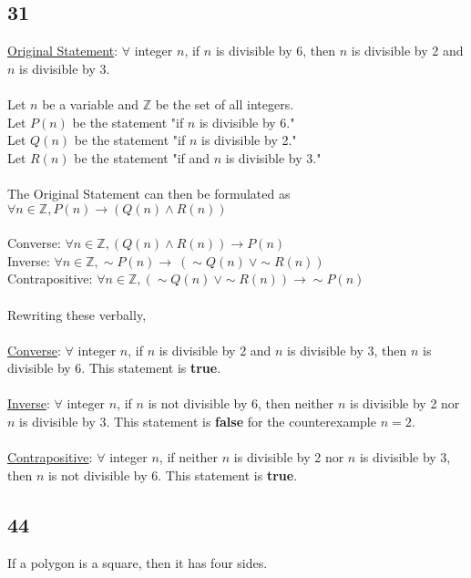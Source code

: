 \documentclass[12pt]{article}
\begin{document}
\subsection*{31}
\underline{Original Statement}: $\forall$ integer $n$, if $n$ is divisible by 6, then $n$ is divisible by 2 and $n$ is divisible by $3$.
\\ \\
Let $n$ be a variable and $\mathbb{Z}$ be the set of all integers. \\
Let $P(n)$ be the statement "if $n$ is divisible by 6." \\
Let $Q(n)$ be the statement "if $n$ is divisible by 2." \\
Let $R(n)$ be the statement "if and $n$ is divisible by 3."
\\ \\
The Original Statement can then be formulated as $\forall n \in \mathbb{Z}, P(n) \rightarrow (Q(n) \wedge R(n))$
\\ \\
Converse: $\forall n \in \mathbb{Z}, (Q(n) \wedge R(n)) \rightarrow P(n)$ \\
Inverse: $\forall n \in \mathbb{Z}, \sim P(n) \rightarrow \ (\sim Q(n) \ \vee \sim R(n))$ \\
Contrapositive: $\forall n \in \mathbb{Z}, (\sim Q(n) \ \vee \sim R(n)) \rightarrow \sim P(n)$
\\ \\
Rewriting these verbally, 
\\ \\
\underline{Converse}: $\forall$ integer $n$, if $n$ is divisible by 2 and  $n$ is divisible by 3, then $n$ is divisible by 6. This statement is \textbf{true}.
\\ \\
\underline{Inverse}: $\forall$ integer $n$, if $n$ is not divisible by 6, then neither $n$ is divisible by 2 nor $n$ is divisible by 3. This statement is \textbf{false} for the counterexample $n = 2$.
\\ \\
\underline{Contrapositive}: $\forall$ integer $n$, if neither $n$ is divisible by 2 nor $n$ is divisible by 3, then $n$ is not divisible by 6. This statement is \textbf{true}.

\subsection*{44}
If a polygon is a square, then it has four sides.
\end{document}
